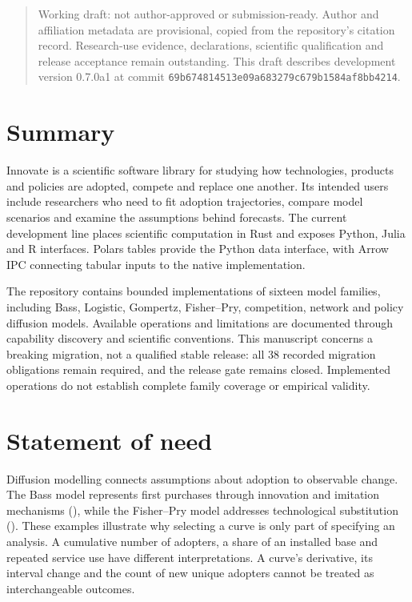 \documentclass[10pt,a4paper,onecolumn]{article}
\begin{document}
\begin{quote}
Working draft: not author-approved or submission-ready. Author and
affiliation metadata are provisional, copied from the repository's
citation record. Research-use evidence, declarations, scientific
qualification and release acceptance remain outstanding. This draft
describes development version 0.7.0a1 at commit
\texttt{69b674814513e09a683279c679b1584af8bb4214}.
\end{quote}

\section{Summary}\label{summary}

Innovate is a scientific software library for studying how technologies,
products and policies are adopted, compete and replace one another. Its
intended users include researchers who need to fit adoption
trajectories, compare model scenarios and examine the assumptions behind
forecasts. The current development line places scientific computation in
Rust and exposes Python, Julia and R interfaces. Polars tables provide
the Python data interface, with Arrow IPC connecting tabular inputs to
the native implementation.

The repository contains bounded implementations of sixteen model
families, including Bass, Logistic, Gompertz, Fisher--Pry, competition,
network and policy diffusion models. Available operations and
limitations are documented through capability discovery and scientific
conventions. This manuscript concerns a breaking migration, not a
qualified stable release: all 38 recorded migration obligations remain
required, and the release gate remains closed. Implemented operations do
not establish complete family coverage or empirical validity.

\section{Statement of need}\label{statement-of-need}

Diffusion modelling connects assumptions about adoption to observable
change. The Bass model represents first purchases through innovation and
imitation mechanisms (), while the
Fisher--Pry model addresses technological substitution
(). These examples
illustrate why selecting a curve is only part of specifying an analysis.
A cumulative number of adopters, a share of an installed base and
repeated service use have different interpretations. A curve's
derivative, its interval change and the count of new unique adopters
cannot be treated as interchangeable outcomes.
\end{document}
